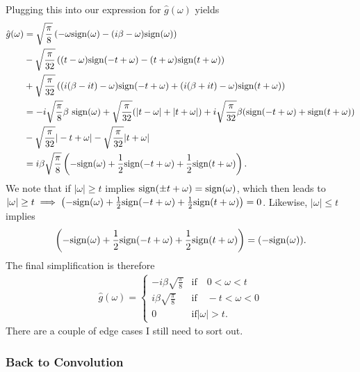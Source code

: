 \documentclass[
 amsmath,amssymb,
 aps,
onecolumn, 
nofootinbib]{revtex4-2}
\newcommand{\abs}[1]{\left| #1 \right|}
\begin{document}
Plugging this into our expression for $\hat{g}(\omega)$ yields
\begin{align}
    \hat{g}(\omega) &= \sqrt{\frac{\pi}{8}} \left(-\omega {\rm sign}(\omega) - (i \beta - \omega) {\rm sign}(\omega) \right) \\
    &- \sqrt{\frac{\pi}{32}}\left((t - \omega){\rm sign}(-t + \omega) -  (t + \omega){\rm sign}(t + \omega) \right) \\
    &+ \sqrt{\frac{\pi}{32}} \left((i (\beta - i t) - \omega) {\rm sign}(-t + \omega) + (i (\beta + i t) - \omega) {\rm sign}(t + \omega) \right) \\
    &= -i\sqrt{\frac{\pi}{8}} \beta ~{\rm sign}(\omega) + \sqrt{\frac{\pi}{32}} (\abs{t- \omega} + \abs{t + \omega}) + i \sqrt{\frac{\pi}{32}} \beta ({\rm sign}(-t + \omega) + {\rm sign}(t + \omega)) \\
    &- \sqrt{\frac{\pi}{32}} |-t + \omega| - \sqrt{\frac{\pi}{32}} |t + \omega| \\
    &= i \beta \sqrt{\frac{\pi}{8}} \left( -{\rm sign}(\omega) + \frac{1}{2} {\rm sign}(-t + \omega) + \frac{1}{2} {\rm sign} (t + \omega) \right).
\end{align}
We note that if $\abs{\omega} \ge t$ implies ${\rm sign}(\pm t +\omega ) = {\rm sign}(\omega)$, which then leads to $|\omega| \ge t \implies \left( -{\rm sign}(\omega) + \frac{1}{2} {\rm sign}(-t + \omega) + \frac{1}{2} {\rm sign} (t + \omega) \right) = 0$. Likewise, $|\omega| \le t$ implies 
\begin{align}
    \left( -{\rm sign}(\omega) + \frac{1}{2} {\rm sign}(-t + \omega) + \frac{1}{2} {\rm sign} (t + \omega) \right) = (- {\rm sign}(\omega)). 
\end{align}
The final simplification is therefore
\begin{align}
    \hat{g}(\omega) = \begin{cases}
        - i \beta \sqrt{\frac{\pi}{8}} & \text{if} \quad 0 < \omega < t \\
        i \beta \sqrt{\frac{\pi}{8}} & \text{if} \quad -t < \omega < 0 \\
        0 & \text{if} \abs{\omega} > t.
    \end{cases}
\end{align}
There are a couple of edge cases I still need to sort out. 

\subsubsection{Back to Convolution}
\end{document}
